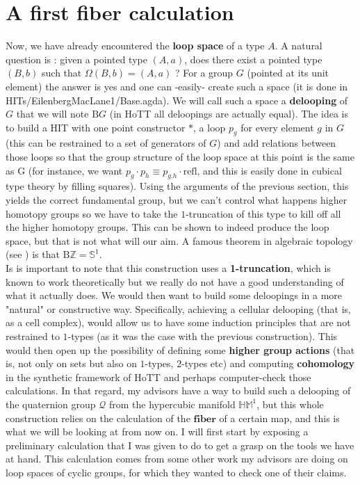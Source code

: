 \documentclass{report}
\begin{document}
\section{A first fiber calculation}
Now, we have already encountered the \textbf{loop space} of a type $A$. A natural question is : given a pointed type $(A,a)$, does there exist a pointed type $(B,b)$ such that $\Omega(B,b)=(A,a)$ ? For a group $G$ (pointed at its unit element) the answer is yes and one can -easily- create such a space (it is done in \cite{cubicalagda} HITs/EilenbergMacLane1/Base.agda). We will call such a space a \textbf{delooping} of $G$ that we will note $\mathrm{B}G$ (in HoTT all deloopings are actually equal). The idea is to build a HIT with one point constructor $*$, a loop $p_g$ for every element $g$ in $G$ (this can be restrained to a set of generators of $G$) and add relations between those loops so that the group structure of the loop space at this point is the same as G (for instance, we want $p_g \cdot p_h \equiv p_{g.h} \cdot \mathrm{refl}$, and this is easily done in cubical type theory by filling squares). Using the arguments of the previous section, this yields the correct fundamental group, but we can't control what happens higher homotopy groups so we have to take the $1$-truncation of this type to kill off all the higher homotopy groups. This can be shown to indeed produce the loop space, but that is  not what will our aim. A famous theorem in algebraic topology (see \cite{hott}) is that $\mathrm{B}\mathbb Z = \mathbb{S}^1$.\\
Is is important to note that this construction uses a \textbf{1-truncation}, which is known to work theoretically but we really do not have a good understanding of what it actually does. We would then want to build some deloopings in a more "natural" or constructive way. Specifically, achieving a cellular delooping (that is, as a cell complex), would allow us to have some induction principles that are not restrained to $1$-types (as it was the case with the previous construction). This would then open up the possibility of defining some \textbf{higher group actions} (that is, not only on sets but also on $1$-types, $2$-types etc) and computing \textbf{cohomology} in the synthetic framework of HoTT and perhaps computer-check those calculations. In that regard, my advisors have a way to build such a delooping of the quaternion group $\mathcal Q$ from the hypercubic manifold $\mathbb{HM}^1$, but this whole construction relies on the calculation of the $\textbf{fiber}$ of a certain map, and this is what we will be looking at from now on. I will first start by exposing a preliminary calculation that I was given to do to get a grasp on the tools we have at hand. This calculation comes from some other work my advisors are doing on loop spaces of cyclic groups, for which they wanted to check one of their claims.
\end{document}
